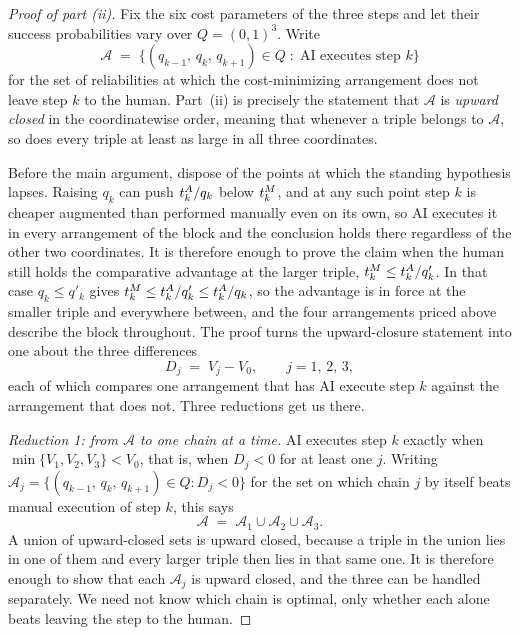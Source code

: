 \begin{proof}[Proof of part (ii)]
Fix the six cost parameters of the three steps and let their success probabilities vary over $Q = (0,1)^3$.
Write
\[ \mathcal{A} \;=\; \bigl\{ (q_{k-1},\, q_k,\, q_{k+1}) \in Q \; : \; \text{AI executes step } k \bigr\} \]
for the set of reliabilities at which the cost-minimizing arrangement does not leave step $k$ to the human.
Part~(ii) is precisely the statement that $\mathcal{A}$ is \emph{upward closed} in the coordinatewise order, meaning that whenever a triple belongs to $\mathcal{A}$, so does every triple at least as large in all three coordinates.

Before the main argument, dispose of the points at which the standing hypothesis lapses.
Raising $q_k$ can push $t^{A}_{k}/q_k$ below $t^{M}_{k}$, and at any such point step $k$ is cheaper augmented than performed manually even on its own, so AI executes it in every arrangement of the block and the conclusion holds there regardless of the other two coordinates.
It is therefore enough to prove the claim when the human still holds the comparative advantage at the larger triple, $t^{M}_{k} \leq t^{A}_{k}/q'_k$.
In that case $q_k \leq q'_k$ gives $t^{M}_{k} \leq t^{A}_{k}/q'_k \leq t^{A}_{k}/q_k$, so the advantage is in force at the smaller triple and everywhere between, and the four arrangements priced above describe the block throughout.
The proof turns the upward-closure statement into one about the three differences
\[ D_j \;=\; V_j - V_0, \qquad j = 1,\, 2,\, 3, \]
each of which compares one arrangement that has AI execute step $k$ against the arrangement that does not.
Three reductions get us there.

\begin{sloppypar}
\emph{Reduction 1: from $\mathcal{A}$ to one chain at a time.}
AI executes step $k$ exactly when $\min\{V_1, V_2, V_3\} < V_0$, that is, when $D_j < 0$ for at least one $j$.
Writing $\mathcal{A}_j = \{(q_{k-1},\, q_k,\, q_{k+1}) \in Q : D_j < 0\}$ for the set on which chain $j$ by itself beats manual execution of step $k$, this says
\[ \mathcal{A} \;=\; \mathcal{A}_1 \cup \mathcal{A}_2 \cup \mathcal{A}_3 . \]
A union of upward-closed sets is upward closed, because a triple in the union lies in one of them and every larger triple then lies in that same one.
It is therefore enough to show that each $\mathcal{A}_j$ is upward closed, and the three can be handled separately.
We need not know which chain is optimal, only whether each alone beats leaving the step to the human.
\end{sloppypar}


\end{proof}
